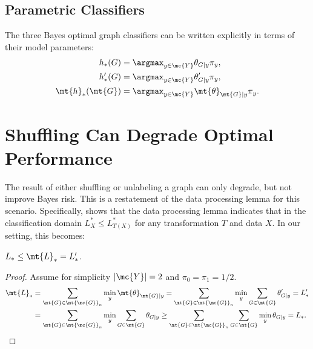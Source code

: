 \documentclass[10pt,journal,cspaper,compsoc]{IEEEtran}
\begin{document}
\subsection{Parametric Classifiers} %
\label{sub:parametric_classifiers}


The three Bayes optimal graph classifiers can be written explicitly in terms of their model parameters:
\begin{align}
	h_*(G) &= \argmax_{y \in \mc{Y}} \theta_{G|y}\pi_y, \\
	h_*'(G) &= \argmax_{y \in \mc{Y}} \theta_{G|y}' \pi_y, \\
	\mt{h}_*(\mt{G}) &= \argmax_{y \in \mc{Y}}  \mt{\theta}_{\mt{G}|y}\pi_y. \label{eq:unbayes2}
\end{align}




\section{Shuffling Can Degrade Optimal Performance} %
\label{sec:shuffle}





The result of either shuffling or unlabeling a graph can only degrade, but not improve Bayes risk.  This is a restatement of the data processing lemma for this scenario. Specifically, \cite{DEV96} shows that the data processing lemma indicates that in the classification domain $L^*_X \leq L^*_{T(X)}$ for any transformation $T$ and data $X$.  In our setting, this becomes:

\begin{thm} \label{thm:1}
$L_* \leq \mt{L}_*=L_*'$.
\end{thm}

\begin{proof}
	Assume for simplicity $|\mc{Y}|=2$ and $\pi_0=\pi_1=1/2$.  
\begin{align} \label{eq:thm1}
	\mt{L}_*&=\sum_{\mt{G} \in \mt{\mc{G}}_n} \min_y  \mt{\theta}_{\mt{G}|y}  
	=\sum_{\mt{G} \in \mt{\mc{G}}_n} \min_y  \sum_{G \in \mt{G}}\theta_{G|y}'  = L_*' \nonumber \\
	&=\sum_{\mt{G} \in \mt{\mc{G}}_n} \min_y  \sum_{G \in \mt{G}}\theta_{G|y} 
	 \geq \sum_{\mt{G} \in \mt{\mc{G}}_n} \sum_{G \in \mt{G}} \min_y  \theta_{G|y}  = L_*.
\end{align}
\end{proof}
\end{document}
